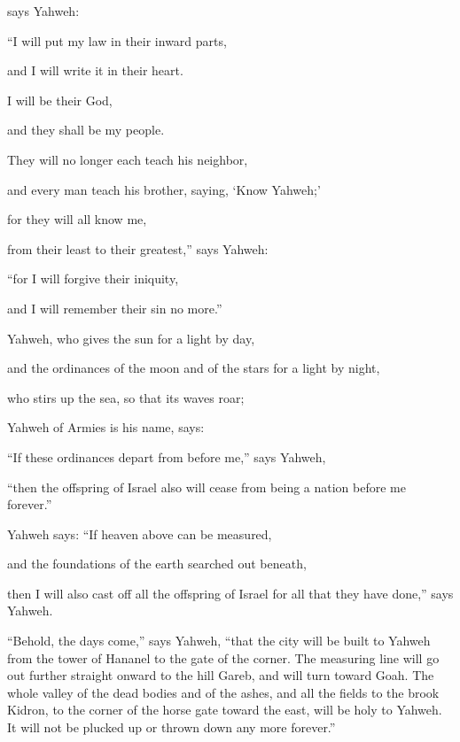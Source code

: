 {\par }{\QB says Yahweh:
\par }{\Q “I will put my law in their inward parts,
\par }{\QB and I will write it in their heart.
\par }{\Q I will be their God,
\par }{\QB and they shall be my people.
\par }{\Q {}They will no longer each teach his neighbor,
\par }{\QB and every man teach his brother, saying, ‘Know Yahweh;’
\par }{\Q for they will all know me,
\par }{\QB from their least to their greatest,” says Yahweh:
\par }{\Q “for I will forgive their iniquity,
\par }{\QB and I will remember their sin no more.”
\par }{\Q {}Yahweh, who gives the sun for a light by day,
\par }{\QB and the ordinances of the moon and of the stars for a light by night,
\par }{\Q who stirs up the sea, so that its waves roar;
\par }{\QB Yahweh of Armies is his name, says:
\par }{\Q {}“If these ordinances depart from before me,” says Yahweh,
\par }{\QB “then the offspring of Israel also will cease from being a nation before me forever.”
\par }{\Q {}Yahweh says: “If heaven above can be measured,
\par }{\QB and the foundations of the earth searched out beneath,
\par }{\QB then I will also cast off all the offspring of Israel for all that they have done,” says Yahweh.
\par }{\PP {}“Behold, the days come,” says Yahweh, “that the city will be built to Yahweh from the tower of Hananel to the gate of the corner.
The measuring line will go out further straight onward to the hill Gareb, and will turn toward Goah.
The whole valley of the dead bodies and of the ashes, and all the fields to the brook Kidron, to the corner of the horse gate toward the east, will be holy to Yahweh. It will not be plucked up or thrown down any more forever.”

}
